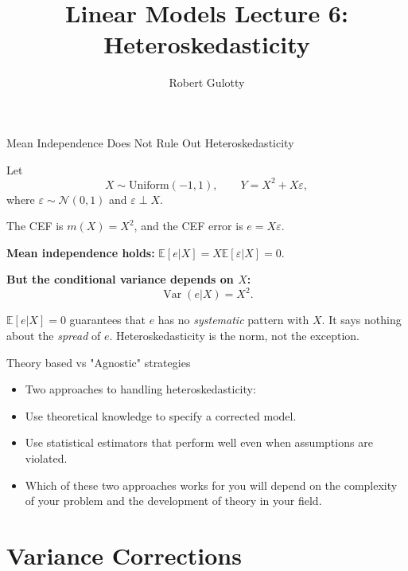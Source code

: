 \documentclass[aspectratio=169]{beamer}
\title[PLSC 30700]{Linear Models Lecture 6: Heteroskedasticity}
\author{Robert Gulotty}
\institute[Chicago]{University of Chicago}
\numberwithin{equation}{section}
\begin{document}
\begin{frame}
\maketitle
\end{frame}

\begin{frame}{Mean Independence Does Not Rule Out Heteroskedasticity}

Let
\[
X \sim \text{Uniform}(-1,1),
\qquad
Y = X^2 + X\varepsilon,
\]
where $\varepsilon \sim \mathcal{N}(0,1)$ and $\varepsilon \perp X$.

\medskip

The CEF is $m(X)=X^2$, and the CEF error is $e = X\varepsilon$.

\medskip
\textbf{Mean independence holds:}\quad
$\mathbb{E}[e|X]
= X\mathbb{E}[\varepsilon|X]
= 0.$

\medskip\pause
\textbf{But the conditional variance depends on $X$:}
\[
\operatorname{Var}(e|X)
= X^2.
\]

\pause
\medskip
\begin{tcolorbox}[colback=blue!5, colframe=blue!50]
$\mathbb{E}[e|X]=0$ guarantees that $e$ has no \emph{systematic} pattern with $X$.  It says nothing about the \emph{spread} of $e$.  Heteroskedasticity is the norm, not the exception.
\end{tcolorbox}
\end{frame}

\begin{frame}{Theory based vs "Agnostic" strategies}
\begin{itemize}
\item Two approaches to handling heteroskedasticity:
\item[1)] Use theoretical knowledge to specify a corrected model.
\item[2)] Use statistical estimators that perform well even when assumptions are violated.
\item Which of these two approaches works for you will depend on the complexity of your problem and the development of theory in your field.
\end{itemize}
\end{frame}


\section{Variance Corrections}
\end{document}
